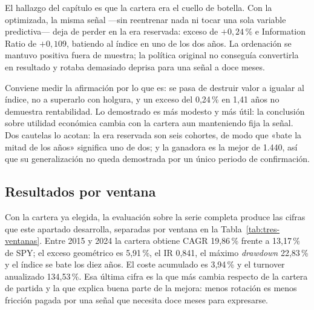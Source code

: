 El hallazgo del capítulo es que la cartera era el cuello de botella. Con la optimizada, la
misma señal ---sin reentrenar nada ni tocar una sola variable predictiva--- deja de perder en la era
reservada: exceso de $+0{,}24$\,\% e Information Ratio de $+0{,}109$, batiendo al índice en uno de
los dos años. La ordenación se mantuvo positiva fuera de muestra; la política original no conseguía
convertirla en resultado y rotaba demasiado deprisa para una señal a doce meses.

Conviene medir la afirmación por lo que es: se pasa de destruir valor a igualar al índice, no a
superarlo con holgura, y un exceso del 0,24\,\% en 1,41 años no demuestra rentabilidad. Lo
demostrado es más modesto y más útil: la conclusión sobre utilidad económica cambia con la cartera
aun manteniendo fija la señal. Dos cautelas lo acotan: la era reservada son seis cohortes, de modo
que «bate la mitad de los años» significa uno de dos; y la ganadora es la mejor de 1.440, así que su
generalización no queda demostrada por un único periodo de confirmación.

\subsection{Resultados por ventana}
\label{sec:economia-completa}

Con la cartera ya elegida, la evaluación sobre la serie completa produce las cifras que este
apartado desarrolla, separadas por ventana en la Tabla~\ref{tab:tres-ventanas}. Entre 2015 y 2024 la
cartera obtiene CAGR 19,86\,\% frente a 13,17\,\% de SPY; el exceso geométrico es 5,91\,\%, el IR
0,841, el máximo \textit{drawdown} 22,83\,\% y el índice se bate los diez años. El coste acumulado
es 3,94\,\% y el turnover anualizado 134,53\,\%. Esa última cifra es la que más cambia respecto de
la cartera de partida y la que explica buena parte de la mejora: menos rotación es menos fricción
pagada por una señal que necesita doce meses para expresarse.

\begin{table}[htbp]
  \centering
  \small
  \caption{Las tres ventanas de evaluación, con su papel declarado.}
  \label{tab:tres-ventanas}
  
  \caption*{Cifras de la cartera adoptada, no de la que el catálogo recomienda. Selección: se
  tomaron decisiones sobre ella. Confirmación: reservada, ninguna decisión la utilizó. Curva
  completa: descriptiva, no probatoria.}
\end{table}

